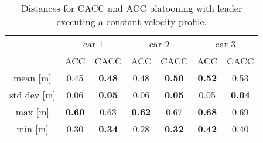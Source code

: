 \begin{table}[]
\begin{tabular}{c|cc|cc|cc|}
\cline{2-7}
                                      & \multicolumn{2}{c|}{car 1}                                    & \multicolumn{2}{c|}{car 2}                                    & \multicolumn{2}{c|}{car 3}                                    \\ \cline{2-7}
\multicolumn{1}{l|}{}                 & \multicolumn{1}{l|}{ACC} & \multicolumn{1}{l|}{{CACC}} & \multicolumn{1}{l|}{ACC} & \multicolumn{1}{l|}{{CACC}} & \multicolumn{1}{l|}{ACC} & \multicolumn{1}{l|}{{CACC}} \\ \hline
\multicolumn{1}{|c|}{mean {[}m{]}} & \multicolumn{1}{c|}{0.45} & \textbf{0.48} & \multicolumn{1}{c|}{0.48} & \textbf{0.50} & \multicolumn{1}{c|}{\textbf{0.52}} & 0.53 \\ \hline
\multicolumn{1}{|c|}{std dev {[}m{]}} & \multicolumn{1}{c|}{0.06} & \textbf{0.05} & \multicolumn{1}{c|}{0.06} & \textbf{0.05} & \multicolumn{1}{c|}{0.05} & \textbf{0.04} \\ \hline
\multicolumn{1}{|c|}{max {[}m{]}} & \multicolumn{1}{c|}{\textbf{0.60}} & 0.63 & \multicolumn{1}{c|}{\textbf{0.62}} & 0.67 & \multicolumn{1}{c|}{\textbf{0.68}} & 0.69 \\ \hline
\multicolumn{1}{|c|}{min {[}m{]}} & \multicolumn{1}{c|}{0.30} & \textbf{0.34} & \multicolumn{1}{c|}{0.28} & \textbf{0.32} & \multicolumn{1}{c|}{\textbf{0.42}} & 0.40 \\ \hline
\cline{2-7}
\end{tabular}
\caption{Distances for CACC and ACC platooning with leader executing a constant velocity profile.}
\label{tab:distances_constant_v}
\end{table}
